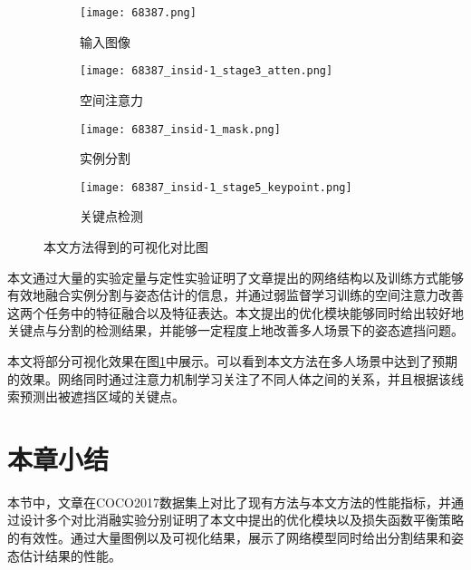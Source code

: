 \begin{figure}[htbp]
\begin{minipage}[t]{\linewidth}
		\vskip5pt
		\begin{subfigure}[b]{0.23\linewidth}
			\texttt{[image: 68387.png]}
			\caption{输入图像}
		\end{subfigure}
		\begin{subfigure}[b]{0.23\linewidth}
			\texttt{[image: 68387\_insid-1\_stage3\_atten.png]}
			\caption{空间注意力}
		\end{subfigure}
		\begin{subfigure}[b]{0.23\linewidth}
			\texttt{[image: 68387\_insid-1\_mask.png]}
			\caption{实例分割}
		\end{subfigure}
		\begin{subfigure}[b]{0.23\linewidth}
			\texttt{[image: 68387\_insid-1\_stage5\_keypoint.png]}
			\caption{关键点检测}
		\end{subfigure}
	\end{minipage}
	\caption{本文方法得到的可视化对比图}
	\label{fig:megavis}
\end{figure}

本文通过大量的实验定量与定性实验证明了文章提出的网络结构以及训练方式能够有效地融合实例分割与姿态估计的信息，并通过弱监督学习训练的空间注意力改善这两个任务中的特征融合以及特征表达。本文提出的优化模块能够同时给出较好地关键点与分割的检测结果，并能够一定程度上地改善多人场景下的姿态遮挡问题。

本文将部分可视化效果在图\ref{fig:megavis}中展示。可以看到本文方法在多人场景中达到了预期的效果。网络同时通过注意力机制学习关注了不同人体之间的关系，并且根据该线索预测出被遮挡区域的关键点。



\section{本章小结}
本节中，文章在COCO2017数据集上对比了现有方法与本文方法的性能指标，并通过设计多个对比消融实验分别证明了本文中提出的优化模块以及损失函数平衡策略的有效性。通过大量图例以及可视化结果，展示了网络模型同时给出分割结果和姿态估计结果的性能。
